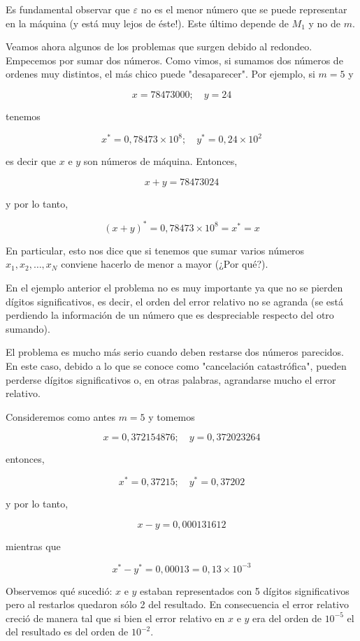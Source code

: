 \documentclass[10pt]{book}
\begin{document}
Es fundamental observar que $\varepsilon$ no es el menor número que se puede representar en la máquina (y está muy lejos de éste!). Este último depende de $M_{1}$ y no de $m$.

Veamos ahora algunos de los problemas que surgen debido al redondeo.\\
Empecemos por sumar dos números. Como vimos, si sumamos dos números de ordenes muy distintos, el más chico puede "desaparecer". Por ejemplo, si $m=5$ y

$$
x=78473000 ; \quad y=24
$$

tenemos

$$
x^{*}=0,78473 \times 10^{8} ; \quad y^{*}=0,24 \times 10^{2}
$$

es decir que $x$ e $y$ son números de máquina. Entonces,

$$
x+y=78473024
$$

y por lo tanto,

$$
(x+y)^{*}=0,78473 \times 10^{8}=x^{*}=x
$$

En particular, esto nos dice que si tenemos que sumar varios números $x_{1}, x_{2}, \ldots, x_{N}$ conviene hacerlo de menor a mayor (¿Por qué?).

En el ejemplo anterior el problema no es muy importante ya que no se pierden dígitos significativos, es decir, el orden del error relativo no se agranda (se está perdiendo la información de un número que es despreciable respecto del otro sumando).

El problema es mucho más serio cuando deben restarse dos números parecidos. En este caso, debido a lo que se conoce como "cancelación catastrófica", pueden perderse dígitos significativos o, en otras palabras, agrandarse mucho el error relativo.

Consideremos como antes $m=5$ y tomemos

$$
x=0,372154876 ; \quad y=0,372023264
$$

entonces,

$$
x^{*}=0,37215 ; \quad y^{*}=0,37202
$$

y por lo tanto,

$$
x-y=0,000131612
$$

mientras que

$$
x^{*}-y^{*}=0,00013=0,13 \times 10^{-3}
$$

Observemos qué sucedió: $x$ e $y$ estaban representados con 5 dígitos significativos pero al restarlos quedaron sólo 2 del resultado. En consecuencia el error relativo creció de manera tal que si bien el error relativo en $x$ e $y$ era del orden de $10^{-5}$ el del resultado es del orden de $10^{-2}$.
\end{document}
